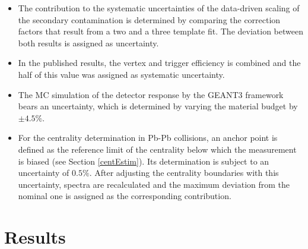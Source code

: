 \documentclass[12pt,a4paper]{report}
\begin{document}
\begin{itemize}

\item The contribution to the systematic uncertainties of the data-driven scaling of the secondary contamination is determined by comparing the correction factors that result from a two and a three template fit. The deviation between both results is assigned as uncertainty.
\item In the published results, the vertex and trigger efficiency is combined and the half of this value was assigned as systematic uncertainty.
\item The MC simulation of the detector response by the GEANT3 framework bears an uncertainty, which is determined by varying the material budget by $\pm 4.5\%$.
\item For the centrality determination in Pb-Pb collisions, an anchor point is defined as the reference limit of the centrality below which the measurement is biased (see Section \ref{centEstim}). Its determination is subject to an uncertainty of $0.5\%$. After adjusting the centrality boundaries with this uncertainty, \pt spectra are recalculated and the maximum deviation from the nominal one is assigned as the corresponding contribution.
\end{itemize} 
\section{Results}
\end{document}
